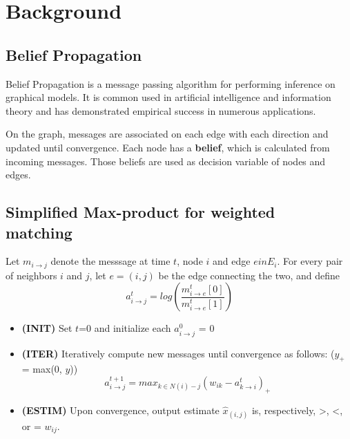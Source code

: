 
\section{Background}

\subsection{Belief Propagation}
Belief Propagation is a message passing algorithm
for performing inference on graphical models. It is common used in artificial intelligence and information theory and has demonstrated empirical success in numerous applications.

On the graph, messages are associated on each edge with each direction and updated until convergence.
Each node has a \textbf{belief}, which is calculated from incoming messages. 
Those beliefs are used as decision variable of nodes and edges. 

\subsection{Simplified Max-product for weighted matching~\cite{BPLPmatching}}
Let $m_{i \rightarrow j}$ denote the messsage at time $t$, node $i$ and edge $e in E_i$. 
For every pair of neighbors $i$ and $j$, let $e = (i, j)$ be the edge connecting the two,
and define 
\begin{displaymath}
a_{i \rightarrow j}^t = log(\frac{m_{i \rightarrow e}^t[0]}{m_{i \rightarrow e}^t[1]})
\end{displaymath}

\begin{itemize}
\item


\textbf{(INIT)} Set $t$=0 and initialize each $a_{i \rightarrow j}^0$ = 0
\item
\textbf{(ITER)} Iteratively compute new messages until convergence as follows: ($y_+$ = max(0, $y$))
\begin{displaymath}
a_{i \rightarrow j}^{t+1} = max_{k \in N(i)-j} (w_{ik} - a_{k \rightarrow i}^{t})_+
\end{displaymath}
\item
\textbf{(ESTIM)} Upon convergence, output estimate $\hat{x}_{(i,j)}$ is, respectively, >, <, or = $w_{ij}$.
\end{itemize}

